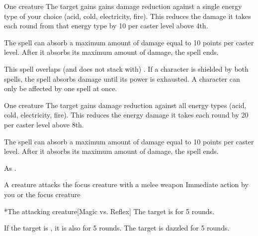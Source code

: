\begin{spelltarget}{One creature}
    \spelleffect The target gains gains damage reduction against a single energy type of your choice (acid, cold, electricity, fire). This reduces the damage it takes each round from that energy type by 10  per caster level above 4th.
    \par The spell can absorb a maximum amount of damage equal to 10 points per caster level. After it absorbs its maximum amount of damage, the spell ends.
\end{spelltarget}
\spellnotes This spell overlaps (and does not stack with) . If a character is shielded by both spells, the  spell absorbs damage until its power is exhausted. A character can only be affected by one  spell at once.

\begin{spelltarget}{One creature}
    \spelleffect The target gains damage reduction against all energy types (acid, cold, electricity, fire). This reduces the energy damage it takes each round by 20  per caster level above 8th.
    \par The spell can absorb a maximum amount of damage equal to 10 points per caster level. After it absorbs its maximum amount of damage, the spell ends.
\end{spelltarget}
\spellnotes As .

\spellrng{\rngclose}
\begin{spelltrigger}{A creature attacks the focus creature with a melee weapon}
     Immediate action by you or the focus creature
    \spellrng{\rngclose}
    \begin{spelltarget}*{The attacking creature}[Magic vs. Reflex]
        \spellsuccess The target is \dazzled for 5 rounds.

        If the target is \bloodied, it is also \blinded for 5 rounds.
        \spellfailure The target is dazzled for 5 rounds.
    \end{spelltarget}
\end{spelltrigger}

